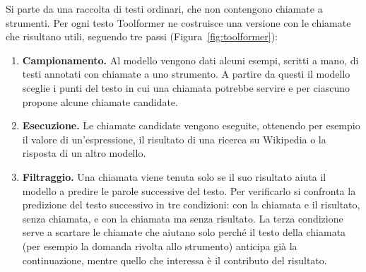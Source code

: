 Si parte da una raccolta di testi ordinari, che non contengono chiamate a strumenti. Per ogni testo Toolformer ne costruisce una versione con le chiamate che risultano utili, seguendo tre passi (Figura~\ref{fig:toolformer}):

\begin{enumerate}
    \item \textbf{Campionamento.} Al modello vengono dati alcuni esempi, scritti a mano, di testi annotati con chiamate a uno strumento. A partire da questi il modello sceglie i punti del testo in cui una chiamata potrebbe servire e per ciascuno propone alcune chiamate candidate.
    \item \textbf{Esecuzione.} Le chiamate candidate vengono eseguite, ottenendo per esempio il valore di un'espressione, il risultato di una ricerca su Wikipedia o la risposta di un altro modello.
    \item \textbf{Filtraggio.} Una chiamata viene tenuta solo se il suo risultato aiuta il modello a predire le parole successive del testo. Per verificarlo si confronta la predizione del testo successivo in tre condizioni: con la chiamata e il risultato, senza chiamata, e con la chiamata ma senza risultato. La terza condizione serve a scartare le chiamate che aiutano solo perché il testo della chiamata (per esempio la domanda rivolta allo strumento) anticipa già la continuazione, mentre quello che interessa è il contributo del risultato.
\end{enumerate}

